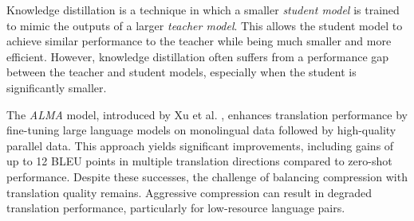 Knowledge distillation is a technique in which a smaller \textit{student model} is trained to mimic the outputs of a larger \textit{teacher model}. This allows the student model to achieve similar performance to the teacher while being much smaller and more efficient. However, knowledge distillation often suffers from a performance gap between the teacher and student models, especially when the student is significantly smaller.


 The \textit{ALMA} model, introduced by Xu et al. \cite{xu2023boostingMT}, enhances translation performance by fine-tuning large language models on monolingual data followed by high-quality parallel data. This approach yields significant improvements, including gains of up to 12 BLEU points in multiple translation directions compared to zero-shot performance. Despite these successes, the challenge of balancing compression with translation quality remains. Aggressive compression can result in degraded translation performance, particularly for low-resource language pairs.

